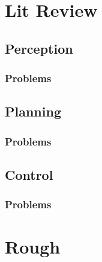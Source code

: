 \chapter{Lit Review}
\section{Perception}
\subsection{Problems}
\section{Planning}
\subsection{Problems}
\section{Control}
\subsection{Problems}
\chapter{Rough}





